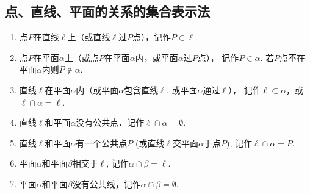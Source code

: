 \subsection{点、直线、平面的关系的集合表示法}

\begin{enumerate}
  \item 点$P$在直线$\ell$上（或直线$\ell$过$P$点），记作$P\in\ell$.
  \item 点$P$在平面$\alpha$上（或点$P$在平面$\alpha$内，或平面$\alpha$过$P$点），
记作$P\in\alpha$. 若$P$点不在平面$\alpha$内则$P\notin \alpha$.
\item 直线$\ell$在平面$\alpha$内（或平面$\alpha$包含直线$\ell$, 或平面$\alpha$通过$\ell$），
记作$\ell\subset \alpha$，或$\ell\cap \alpha=\ell$.
\item 直线$\ell$和平面$\alpha$没有公共点．记作$\ell\cap \alpha=\emptyset$.
\item 直线$\ell$和平面$\alpha$有一个公共点$P$ (或直线$\ell$交平面$\alpha$于点$P$), 
记作$\ell\cap \alpha=P$.
\item 平面$\alpha$和平面$\beta$相交于$\ell$, 记作$\alpha\cap \beta=\ell$.
\item 平面$\alpha$和平面$\beta$没有公共线，记作$\alpha\cap \beta=\emptyset$.
\end{enumerate}

